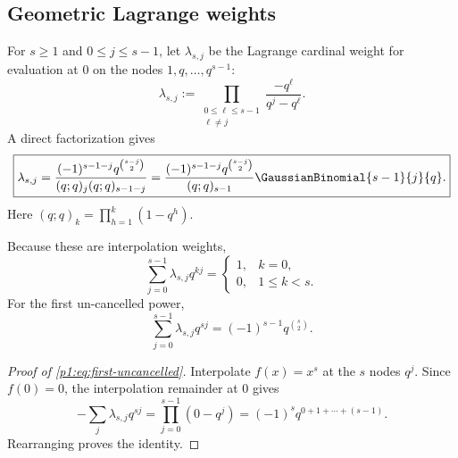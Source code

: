 \documentclass[11pt]{article}
\numberwithin{equation}{section}
\theoremstyle{definition}
\theoremstyle{remark}
\begin{document}
\subsection{Geometric Lagrange weights}

For $s\ge1$ and $0\le j\le s-1$, let $\lambda_{s,j}$ be the Lagrange cardinal weight for evaluation at $0$ on the nodes $1,q,\ldots,q^{s-1}$:
\begin{equation}
 \lambda_{s,j}:=\prod_{\substack{0\le\ell\le s-1\\\ell\ne j}}
 \frac{-q^\ell}{q^j-q^\ell}.
 \label{p1:eq:lambda-Lagrange}
\end{equation}
A direct factorization gives
\begin{equation}
 \boxed{
 \lambda_{s,j}
 =\frac{(-1)^{s-1-j}q^{\binom{s-j}{2}}}
 {(q;q)_j(q;q)_{s-1-j}}
 =\frac{(-1)^{s-1-j}q^{\binom{s-j}{2}}}{(q;q)_{s-1}}
 \GaussianBinomial{s-1}{j}{q}.}
 \label{p1:eq:lambda-qbinomial}
\end{equation}
Here
\((q;q)_k=\prod_{h=1}^{k}(1-q^h)\).

Because these are interpolation weights,
\begin{equation}
 \sum_{j=0}^{s-1}\lambda_{s,j}q^{kj}
 =\begin{cases}
 1,&k=0,\\
 0,&1\le k<s.
 \end{cases}
 \label{p1:eq:lambda-cancellation}
\end{equation}
For the first un-cancelled power,
\begin{equation}
 \sum_{j=0}^{s-1}\lambda_{s,j}q^{sj}
 =(-1)^{s-1}q^{\binom s2}.
 \label{p1:eq:first-uncancelled}
\end{equation}

\begin{proof}[Proof of \eqref{p1:eq:first-uncancelled}]
Interpolate $f(x)=x^s$ at the $s$ nodes $q^j$.  Since $f(0)=0$, the interpolation remainder at $0$ gives
\[
 -\sum_j\lambda_{s,j}q^{sj}
 =\prod_{j=0}^{s-1}(0-q^j)
 =(-1)^sq^{0+1+\cdots+(s-1)}.
\]
Rearranging proves the identity.
\end{proof}
\end{document}
